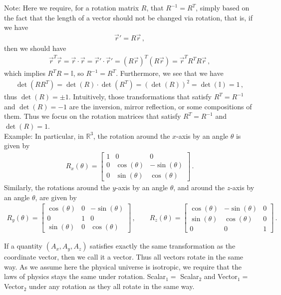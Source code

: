 \documentclass[11pt, onesided]{book}
\theoremstyle{break}
\theoremstyle{break}
\newcommand{\R}{\mathbb{R}}
\newcommand{\bmat}[1]{\begin{bmatrix} #1 \end{bmatrix}}
\newcommand{\note}{\color{red}Note: \color{black}}
\newcommand{\example}{\color{green}Example: \color{black}}
\begin{document}
\note Here we require, for a rotation matrix $R$, that $R^{-1} = R^T$, simply based on the fact that the length of a vector should not be changed via rotation, that is, if we have
\begin{align*}
\vec{r}' = R\vec{r}\,,
\end{align*}
then we should have
\begin{align*}
\vec{r}^T\vec{r} = \vec{r}\cdot \vec{r} = \vec{r}' \cdot \vec{r}' = (R\vec{r})^T(R\vec{r}) = \vec{r}^TR^TR\vec{r}\,,
\end{align*}
which implies $R^TR = \mathbb{I}$, so $R^{-1} = R^T$. Furthermore, we see that we have
\begin{align*}
\det(RR^T) = \det(R)\cdot \det(R^T) =(\det(R))^2 = \det(\mathbb{I}) = 1\,,
\end{align*}
thus $\det(R) =\pm 1$. Intuitively, those transformations that satisfy $R^T = R^{-1}$ and $\det(R) = -1$ are the inversion, mirror reflection, or some compositions of them. Thus we focus on the rotation matrices that satisfy $R^T = R^{-1}$ and $\det(R) = 1$. \\

\example In particular, in $\R^3$, the rotation around the $x$-axis by an angle $\theta$ is given by
\begin{align*}
R_x(\theta) = \bmat{
1 & 0 & 0 \\
0 & \cos(\theta) & -\sin(\theta) \\
0 & \sin(\theta) & \cos(\theta) 
}\,.
\end{align*}
Similarly, the rotations around the $y$-axis by an angle $\theta$, and around the $z$-axis by an angle $\theta$, are given by
\begin{align*}
R_y(\theta) = 
\bmat{
\cos(\theta) & 0 & -\sin(\theta) \\
0 & 1 & 0\\
\sin(\theta) & 0 & \cos(\theta)
}\,,\qquad
R_z(\theta) = \bmat{
\cos(\theta) & -\sin(\theta) & 0\\
\sin(\theta)& \cos(\theta) & 0 \\
 0 & 0 & 1
}\,.
\end{align*} 

If a quantity $(A_x,A_y,A_z)$ satisfies exactly the same transformation as the coordinate vector, then we call it a vector. Thus all vectors rotate in the same way. As we assume here the physical universe is isotropic, we require that the laws of physics stays the same under rotation. Scalar$_1=$ Scalar$_2$ and Vector$_1=$ Vector$_2$ under any rotation as they all rotate in the same way. \\
\end{document}

